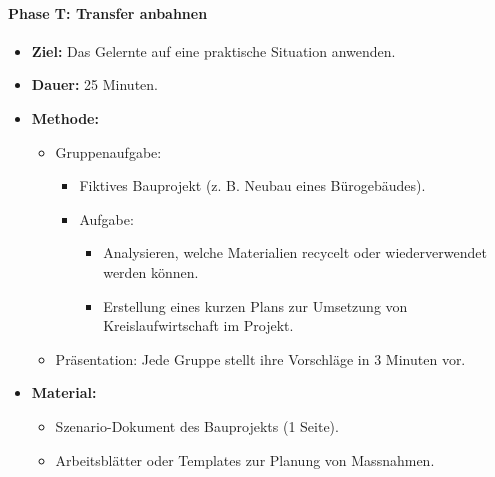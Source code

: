 \documentclass[
11pt,
captions=tableheading,
smallheadings,
headsepline,
footsepline, 
captions=tableheading,
parskip=half-,
]{scrartcl}
\begin{document}
\paragraph{Phase T: Transfer anbahnen}
\begin{itemize}
    \item \textbf{Ziel:} Das Gelernte auf eine praktische Situation anwenden.
    \item \textbf{Dauer:} 25 Minuten.
    \item \textbf{Methode:}
          \begin{itemize}
              \item Gruppenaufgabe:
                    \begin{itemize}
                        \item Fiktives Bauprojekt (z. B. Neubau eines Bürogebäudes).
                        \item Aufgabe:
                              \begin{itemize}
                                  \item Analysieren, welche Materialien recycelt oder wiederverwendet werden können.
                                  \item Erstellung eines kurzen Plans zur Umsetzung von Kreislaufwirtschaft im Projekt.
                              \end{itemize}
                    \end{itemize}
              \item Präsentation: Jede Gruppe stellt ihre Vorschläge in 3 Minuten vor.
          \end{itemize}
    \item \textbf{Material:}
          \begin{itemize}
              \item Szenario-Dokument des Bauprojekts (1 Seite).
              \item Arbeitsblätter oder Templates zur Planung von Massnahmen.
          \end{itemize}
\end{itemize}
\end{document}
